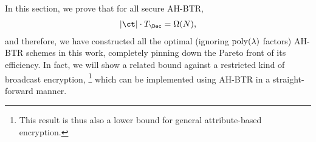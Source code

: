 In this section, we prove that for all secure AH-BTR,
\begin{align*}
|\ct|\cdot T_\Dec=\bigOmega(N),
\end{align*}
and therefore, we have constructed all the optimal (ignoring $\operatorname{poly}(\lambda)$ factors) AH-BTR schemes in this work, completely pinning down the Pareto front of its efficiency.
In fact, we will show a related bound against a restricted kind of broadcast encryption,%
\footnote{This result is thus also a lower bound for general attribute-based encryption.}
which can be implemented using AH-BTR in a straight-forward manner.
